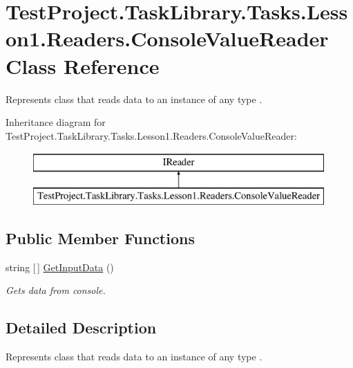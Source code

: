 \hypertarget{class_test_project_1_1_task_library_1_1_tasks_1_1_lesson1_1_1_readers_1_1_console_value_reader}{}\section{Test\+Project.\+Task\+Library.\+Tasks.\+Lesson1.\+Readers.\+Console\+Value\+Reader Class Reference}
\label{class_test_project_1_1_task_library_1_1_tasks_1_1_lesson1_1_1_readers_1_1_console_value_reader}


Represents class that reads data to an instance of any type .  


Inheritance diagram for Test\+Project.\+Task\+Library.\+Tasks.\+Lesson1.\+Readers.\+Console\+Value\+Reader\+:\begin{figure}[H]
\begin{center}
\leavevmode
\includegraphics[height=2.000000cm]{class_test_project_1_1_task_library_1_1_tasks_1_1_lesson1_1_1_readers_1_1_console_value_reader}
\end{center}
\end{figure}
\subsection*{Public Member Functions}
\begin{DoxyCompactItemize}
\item 
string \mbox{[}$\,$\mbox{]} \mbox{\hyperlink{class_test_project_1_1_task_library_1_1_tasks_1_1_lesson1_1_1_readers_1_1_console_value_reader_a5c6bb9a9efd7fc82aaeae719193eb3d6}{Get\+Input\+Data}} ()
\begin{DoxyCompactList}\small\item\em Gets data from console. \end{DoxyCompactList}\end{DoxyCompactItemize}


\subsection{Detailed Description}
Represents class that reads data to an instance of any type . 



